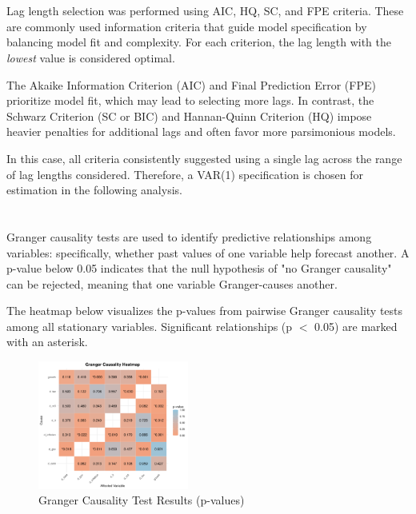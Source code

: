\documentclass[a4paper,12pt]{article}
\begin{document}
\section{}


Lag length selection was performed using AIC, HQ, SC, and FPE criteria. These are commonly used information criteria that guide model specification by balancing model fit and complexity. For each criterion, the lag length with the \textit{lowest} value is considered optimal. 

The Akaike Information Criterion (AIC) and Final Prediction Error (FPE) prioritize model fit, which may lead to selecting more lags. In contrast, the Schwarz Criterion (SC or BIC) and Hannan-Quinn Criterion (HQ) impose heavier penalties for additional lags and often favor more parsimonious models. 

In this case, all criteria consistently suggested using a single lag across the range of lag lengths considered. Therefore, a VAR(1) specification is chosen for estimation in the following analysis.



\section{}

Granger causality tests are used to identify predictive relationships among variables: specifically, whether past values of one variable help forecast another. A p-value below 0.05 indicates that the null hypothesis of "no Granger causality" can be rejected, meaning that one variable Granger-causes another.

The heatmap below visualizes the p-values from pairwise Granger causality tests among all stationary variables. Significant relationships (p $<$ 0.05) are marked with an asterisk.

\begin{figure}[H]
  \centering
  \includegraphics[width=0.44\textwidth]{../results/granger_causality_heatmap.png}
  \caption{Granger Causality Test Results (p-values)}
\end{figure}
\end{document}
